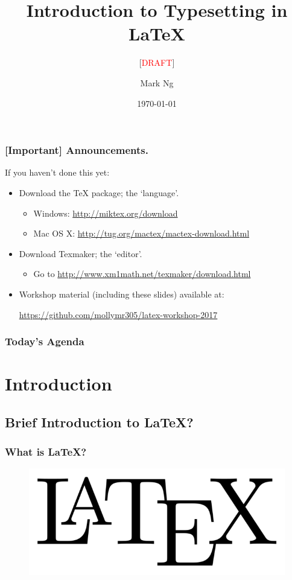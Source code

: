 \documentclass{beamer}
\title[Introduction to Typesetting in \LaTeX{}]{
    Introduction to Typesetting in \LaTeX{}
}
\subtitle{[\textcolor{red}{DRAFT}]}
\author{Mark Ng}
\institute[NUS]{
    National University of Singapore\\
    \medskip
    \textit{latexify@nusmathsoc.org}
}
\date{\today}
\begin{document}
    \begin{frame}
        \titlepage
    \end{frame}

    \begin{frame}
        \frametitle{[Important] Announcements.}
        If you haven't done this yet:
        \begin{itemize}
            \item Download the \TeX{} package; the `language'.
            \begin{itemize}
                \item Windows: \url{http://miktex.org/download}
                \item Mac OS X: \url{http://tug.org/mactex/mactex-download.html}
            \end{itemize}
            \item Download Texmaker; the `editor'.
            \begin{itemize}
                \item Go to \url{http://www.xm1math.net/texmaker/download.html}
            \end{itemize}
            \item Workshop material (including these slides) available at:
            \begin{center}
                \url{https://github.com/mollymr305/latex-workshop-2017}
            \end{center}
        \end{itemize}
    \end{frame}


    \begin{frame}
        \frametitle{Today's Agenda}
        \tableofcontents
    \end{frame}

    \section{Introduction}
    \subsection{Brief Introduction to \LaTeX{}?}
    \begin{frame}
        \frametitle{What is \LaTeX{}?}
        \begin{figure}[H]
            \includegraphics[scale=0.2]{logo.png}
        \end{figure}
    \end{frame}
\end{document}
